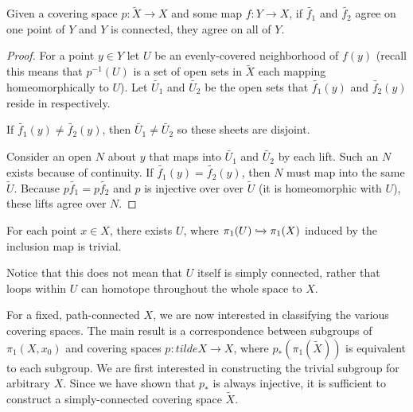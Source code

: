 \documentclass[10pt]{article}
\begin{document}
\begin{proposition}
	Given a covering space $p: \tilde{X} \to X$ and some map $f: Y \to X$, if
	$\tilde{f_1}$ and $\tilde{f_2}$ agree on one point of $Y$ and $Y$ is
	connected, they agree on all of $Y$.
\end{proposition}

\begin{proof}
	For a point $y \in Y$ let $U$ be an evenly-covered neighborhood of $f(y)$
	(recall this means that $p^{-1}(U)$ is a set of open sets in $\tilde{X}$ each
	mapping homeomorphically to $U$). Let $\tilde{U_1}$ and $\tilde{U_2}$ be the
	open sets that $\tilde{f_1}(y)$ and $\tilde{f_2}(y)$ reside in respectively.

	If $\tilde{f_1}(y) \neq \tilde{f_2}(y)$, then $\tilde{U_1} \neq \tilde{U_2}$
	so these sheets are disjoint.

	Consider an open $N$ about $y$ that maps into $\tilde{U_1}$ and $\tilde{U_2}$
	by each lift. Such an $N$ exists because of continuity. If $\tilde{f_1}(y)
	= \tilde{f_2}(y)$, then $N$ must map into the same $\tilde{U}$. Because
	$p\tilde{f_1} = p\tilde{f_2}$ and $p$ is injective over over $\tilde{U}$ (it
	is homeomorphic with $U$), these lifts agree over $N$.
\end{proof}

\begin{definition}
	For each point $x \in X$, there exists $U$, where $\pi_1(U)
	\xhookrightarrow{}{\pi_1(X)}$ induced by the inclusion map is trivial.
\end{definition}

Notice that this does not mean that $U$ itself is simply connected, rather that
loops within $U$ can homotope throughout the whole space to $X$.

For a fixed, path-connected $X$, we are now interested in classifying the
various covering spaces. The main result is a correspondence between subgroups
of $\pi_1(X, x_0)$ and covering spaces $p: tilde{X} \to X$, where
$p_*(\pi_1(\tilde{X}))$ is equivalent to each subgroup. We are first interested
in constructing the trivial subgroup for arbitrary $X$. Since we have shown
that $p_*$ is always injective, it is sufficient to construct a simply-connected covering space $\tilde{X}$.
\end{document}
